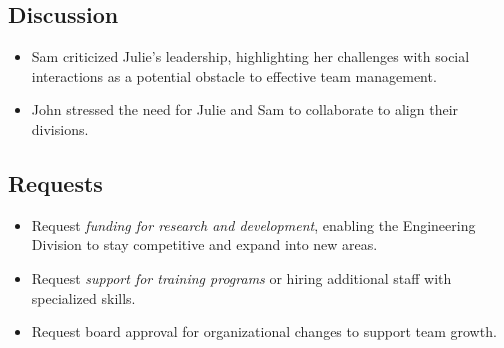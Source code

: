 \documentclass[a4paper,12pt]{article}
\begin{document}
\subsection{Discussion}

\begin{itemize}
    \item Sam criticized Julie's leadership, highlighting her challenges with social interactions as a potential obstacle to effective team management.
    \item John stressed the need for Julie and Sam to collaborate to align their divisions.
\end{itemize}

\subsection{Requests}

\begin{itemize}
    \item Request \textit{funding for research and development}, enabling the Engineering Division to stay competitive and expand into new areas. 
    \item Request \textit{support for training programs} or hiring additional staff with specialized skills.
    \item Request board approval for organizational changes to support team growth.
\end{itemize}
\end{document}
